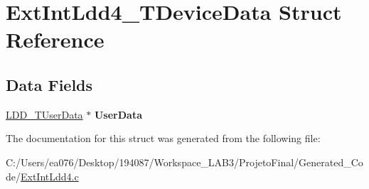 \hypertarget{struct_ext_int_ldd4___t_device_data}{\section{Ext\-Int\-Ldd4\-\_\-\-T\-Device\-Data Struct Reference}
\label{struct_ext_int_ldd4___t_device_data}
}
\subsection*{Data Fields}
\begin{DoxyCompactItemize}
\item 
\hypertarget{struct_ext_int_ldd4___t_device_data_a44c4015f5569fd956b470915b2e4be21}{\hyperlink{group___p_e___types__module_ga0b66a73f87238a782318aa0be7578e35}{L\-D\-D\-\_\-\-T\-User\-Data} $\ast$ {\bfseries User\-Data}}\label{struct_ext_int_ldd4___t_device_data_a44c4015f5569fd956b470915b2e4be21}

\end{DoxyCompactItemize}


The documentation for this struct was generated from the following file\-:\begin{DoxyCompactItemize}
\item 
C\-:/\-Users/ea076/\-Desktop/194087/\-Workspace\-\_\-\-L\-A\-B3/\-Projeto\-Final/\-Generated\-\_\-\-Code/\hyperlink{_ext_int_ldd4_8c}{Ext\-Int\-Ldd4.\-c}\end{DoxyCompactItemize}

